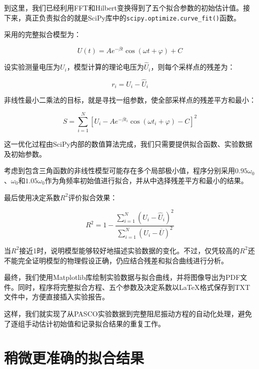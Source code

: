 \documentclass[UTF8]{ctexart}
\begin{document}
\noindent 到这里，我们已经利用FFT和Hilbert变换得到了五个拟合参数的初始估计值。接下来，真正负责拟合的就是SciPy库中的\texttt{scipy.optimize.curve\_fit()}函数。

\noindent 采用的完整拟合模型为：

\begin{equation}
U(t)=Ae^{-\beta t}\cos(\omega t+\varphi)+C
\end{equation}

\noindent 设实验测量电压为$U_i$，模型计算的理论电压为$\hat U_i$，则每个采样点的残差为：

\begin{equation}
r_i=U_i-\hat U_i
\end{equation}

\noindent 非线性最小二乘法的目标，就是寻找一组参数，使全部采样点的残差平方和最小：

\begin{equation}
\boxed{
S=\sum_{i=1}^{N}
\left[
U_i-Ae^{-\beta t_i}
\cos(\omega t_i+\varphi)-C
\right]^2
}
\end{equation}

\noindent 这一优化过程由SciPy内部的数值算法完成，我们只需要提供拟合函数、实验数据及初始参数。

\noindent 考虑到包含三角函数的非线性模型可能存在多个局部极小值，程序分别采用$0.95\omega_0$、$\omega_0$和$1.05\omega_0$作为角频率初始值进行拟合，并从中选择残差平方和最小的结果。

\noindent 最后使用决定系数$R^2$评价拟合效果：

\begin{equation}
R^2=
1-\frac{\displaystyle\sum_{i=1}^{N}(U_i-\hat U_i)^2}
{\displaystyle\sum_{i=1}^{N}(U_i-\overline U)^2}
\end{equation}

\noindent 当$R^2$接近1时，说明模型能够较好地描述实验数据的变化。不过，仅凭较高的$R^2$还不能完全证明模型的物理假设正确，仍应结合残差和拟合曲线进行分析。

\noindent 最终，我们使用Matplotlib库绘制实验数据与拟合曲线，并将图像导出为PDF文件。同时，程序将完整拟合方程、五个参数及决定系数以LaTeX格式保存到TXT文件中，方便直接插入实验报告。

\noindent 这样，我们就实现了从PASCO实验数据到完整阻尼振动方程的自动化处理，避免了逐组手动估计初始值和记录拟合结果的重复工作。

\section{稍微更准确的拟合结果}
\end{document}
